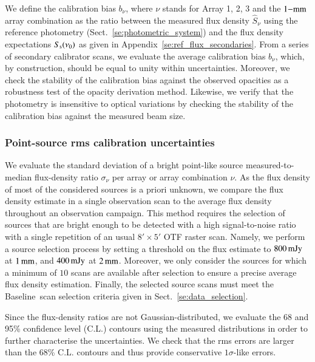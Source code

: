 \documentclass[traditionalabstract]{aa}
\newcommand{\baseline}{Baseline}%
\newcommand{\lp}[1]{#1}
\newcommand{\rev}[1]{#1}
\begin{document}
{We define the calibration bias
$b_{\nu}$, where $\nu$ stands for Array 1, 2, 3 and the
$1\rm{-mm}$ array combination as
the ratio between the measured flux density $\hat{S}_{\nu}$ using the
reference photometry
(Sect.~\ref{se:photometric_system}) and the flux density
expectations $S_{\rm{s}}(\nu_0)$ as given in
Appendix~\ref{se:ref_flux_secondaries}. From a series of
secondary calibrator scans, we evaluate the average calibration bias
$b_{\nu}$, which, by construction, should be equal to
unity within uncertainties.
Moreover, we check the stability of the calibration bias against
the observed opacities as a robustness test of the
opacity derivation method. Likewise, we verify that the photometry is
insensitive to optical variations by checking the stability of the
calibration bias against the measured beam size.

\subsubsection{{\rev Point-source} rms calibration uncertainties}
\label{se:def_calibration_rms_error}
We evaluate the standard deviation of a bright {\rev point-like} source
measured-to-median flux-density ratio $\sigma_{\nu}$ per array or array combination $\nu$.
As the flux density of most of the considered sources is a priori unknown, we
compare the flux density estimate in a single observation scan to the
average flux density throughout an observation campaign. This method
requires the selection of sources that are bright enough to be
detected with a high signal-to-noise ratio with a single repetition of an usual
$8'\times 5'$ OTF raster scan. Namely, we perform a source
selection process by setting a threshold on the flux estimate to $800\,\rm{mJy}$ at
$1\,\rm{mm}$, and $400\,\rm{mJy}$ at $2\,\rm{mm}$. Moreover, we only consider the sources for which a minimum of $10$ scans are available after
selection to ensure a precise average flux density
estimation. Finally, the selected source scans must meet the \baseline\
scan selection criteria given in Sect.~\ref{se:data_selection}.

{\lp Since the flux-density ratios are not Gaussian-distributed, we
evaluate the 68 and 95\% confidence level (C.L.) contours using the
measured distributions in order to further characterise the
uncertainties. We check that the rms
errors are larger than the 68\% C.L. contours and thus provide
conservative $1\sigma$-like errors.}    

}
\end{document}
